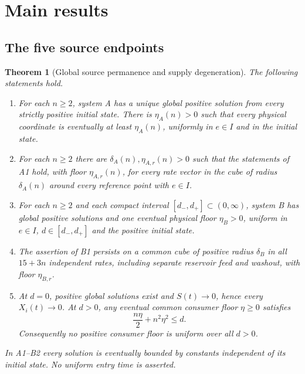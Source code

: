 \documentclass[11pt,a4paper]{article}
\theoremstyle{plain}
\newtheorem{theorem}{Theorem}[section]
\theoremstyle{definition}
\theoremstyle{remark}
\begin{document}
\section{Main results}\label{sec:results}

\subsection{The five source endpoints}
\begin{theorem}[Global source permanence and supply degeneration]\label{thm:roots}
The following statements hold.
\begin{enumerate}[label=\textup{\bfseries\Alph{*}},ref=\Alph{*}]
\item[\textup{A1.}] For each $n\ge2$, system A has a unique global positive solution from every strictly positive initial state. There is $\eta_A(n)>0$ such that every physical coordinate is eventually at least $\eta_A(n)$, uniformly in $e\in I$ and in the initial state.
\item[\textup{A2.}] For each $n\ge2$ there are $\delta_A(n),\eta_{A,r}(n)>0$ such that the statements of A1 hold, with floor $\eta_{A,r}(n)$, for every rate vector in the cube of radius $\delta_A(n)$ around every reference point with $e\in I$.
\item[\textup{B1.}] For each $n\ge2$ and each compact interval $[d_-,d_+]\subset(0,\infty)$, system B has global positive solutions and one eventual physical floor $\eta_B>0$, uniform in $e\in I$, $d\in[d_-,d_+]$ and the positive initial state.
\item[\textup{B2.}] The assertion of B1 persists on a common cube of positive radius $\delta_B$ in all $15+3n$ independent rates, including separate reservoir feed and washout, with floor $\eta_{B,r}$.
\item[\textup{B3.}] At $d=0$, positive global solutions exist and $S(t)\to0$, hence every $X_i(t)\to0$. At $d>0$, any eventual common consumer floor $\eta\ge0$ satisfies
\begin{equation}\label{eq:necessary}
\frac{n\eta}{2}+n^2\eta^2\le d.
\end{equation}
Consequently no positive consumer floor is uniform over all $d>0$.
\end{enumerate}
In A1--B2 every solution is eventually bounded by constants independent of its initial state. No uniform entry time is asserted.
\end{theorem}
\end{document}
